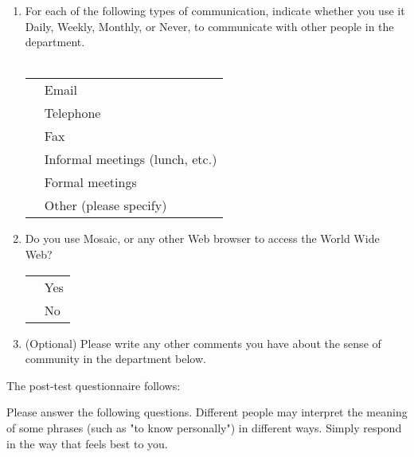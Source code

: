 \begin{enumerate}
\item{For each of the following types of communication, indicate whether
  you use it Daily, Weekly, Monthly, or Never, to communicate with other
  people in the department.}\\
\\
  \begin{tabular}{ll}
    \underline{  }\underline{  }\underline{  }  & Email\\
    \underline{  }\underline{  }\underline{  }  & Telephone\\
    \underline{  }\underline{  }\underline{  }  & Fax\\
    \underline{  }\underline{  }\underline{  }  & Informal meetings (lunch, etc.)\\
    \underline{  }\underline{  }\underline{  }  & Formal meetings\\
    \underline{  }\underline{  }\underline{  }  & Other (please specify)\\
  \end{tabular}

\item{Do you use Mosaic, or any other Web browser to access the World Wide
  Web?}\\
  \begin{tabular}{ll}
  \underline{  }\underline{  }\underline{  }  & Yes\\
  \underline{  }\underline{  }\underline{  }  & No\\
  \end{tabular}

\item{(Optional) Please write any other comments you have about the sense
  of community in the department below.}

\end{enumerate}

The post-test questionnaire follows:

Please answer the following questions.  Different people may interpret the
meaning of some phrases (such as "to know personally") in different
ways. Simply respond in the way that feels best to you.

